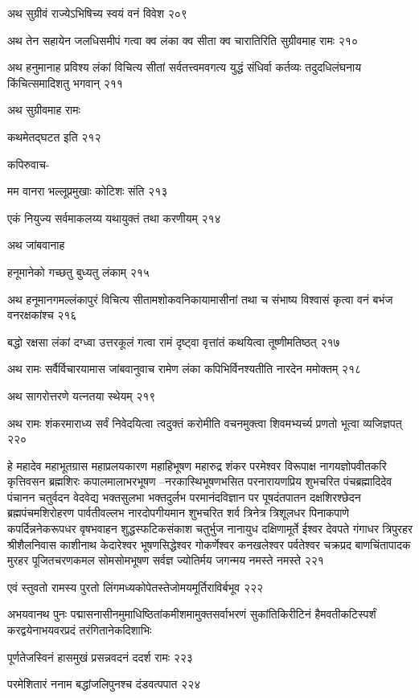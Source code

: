 अथ सुग्रीवं राज्येऽभिषिच्य स्वयं वनं विवेश २०९

अथ तेन सहायेन जलधिसमीपं गत्वा क्व लंका क्व सीता क्व चारातिरिति सुग्रीवमाह रामः २१०

अथ हनुमानाह प्रविश्य लंकां विचित्य सीतां सर्वतत्त्वमवगत्य युद्धं संधिर्वा कर्तव्यः
तदुदधिलंघनाय किंचित्समादिशतु भगवान् २११

अथ सुग्रीवमाह रामः

कथमेतद्घटत इति २१२

कपिरुवाच-

मम वानरा भल्लूप्रमुखाः कोटिशः संति २१३

एकं नियुज्य सर्वमाकलय्य यथायुक्तं तथा करणीयम् २१४

अथ जांबवानाह

हनूमानेको गच्छतु बुध्यतु लंकाम् २१५

अथ हनूमानगमल्लंकापुरं विचित्य सीतामशोकवनिकायामासीनां तथा च संभाष्य विश्वासं कृत्वा वनं
बभंज वनरक्षकांश्च २१६

बद्धो रक्षसा लंकां दग्ध्वा उत्तरकूलं गत्वा रामं दृष्ट्वा वृत्तांतं कथयित्वा तूष्णीमतिष्ठत् २१७

अथ रामः सर्वैर्विचारयामास जांबवानुवाच रामेण लंका कपिभिर्विनश्यतीति नारदेन ममोक्तम्
 २१८

अथ सागरोत्तरणे यत्नतया स्थेयम् २१९

अथ रामः शंकरमाराध्य सर्वं निवेदयित्वा त्वदुक्तं करोमीति वचनमुक्त्वा शिवमभ्यर्च्य प्रणतो
भूत्वा व्यजिज्ञपत् २२०

हे महादेव महाभूतग्रास महाप्रलयकारण महाहिभूषण महारुद्र शंकर परमेश्वर विरूपाक्ष
नागयज्ञोपवीतकरि कृत्तिवसन ब्रह्मशिरः कपालमालाभरभूषण –नरकास्थिभूषणभसित
परनारायणप्रिय शुभचरित पंचब्रह्मादिदेव पंचानन चतुर्वदन वेदवेद्य भक्तसुलभा भक्तदुर्लभ
परमानंदविज्ञान पर पूषदंतपातन दक्षशिरश्छेदन ब्रह्मपंचमशिरोहरण पार्वतीवल्लभ
नारदोपगीयमान शुभचरित शर्व त्रिनेत्र त्रिशूलधर पिनाकपाणे कपर्दिन्ननेकरूपधर वृषभवाहन
शुद्धस्फटिकसंकाश चतुर्भुज नानायुध दक्षिणामूर्ते ईश्वर देवपते गंगाधर त्रिपुरहर श्रीशैलनिवास
काशीनाथ केदारेश्वर भूषणसिद्धेश्वर गोकर्णेश्वर कनखलेश्वर पर्वतेश्वर चक्रप्रद बाणचिंतापादक
मुरहर पूजितचरणकमल सोमसोमभूषण सर्वज्ञ ज्योतिर्मय जगन्मय नमस्ते नमस्ते २२१

एवं स्तुवतो रामस्य पुरतो लिंगमध्यकोपेतस्तेजोमयमूर्तिराविर्बभूव २२२

अभयवानथ पुनः पद्मासनासीनमुमाधिष्ठितांकमीशमामुक्तसर्वाभरणं सुकांतिकिरीटिनं
हैमवतीकटिस्पर्शं करद्वयेनाभयवरप्रदं तरंगितानेकदिशाभिः

पूर्णतेजस्विनं हासमुखं प्रसन्नवदनं ददर्श रामः २२३

परमेशितारं ननाम बद्धांजलिपुनश्च दंडवत्पपात २२४


